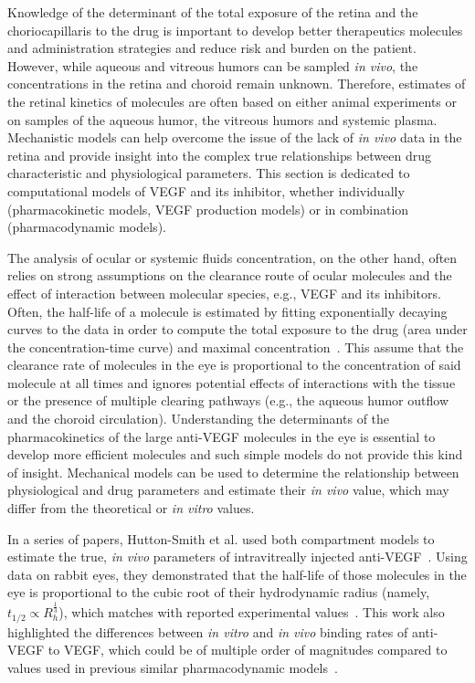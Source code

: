 \documentclass[11pt,a4paper]{article}
\begin{document}
Knowledge of the determinant of the total exposure of the retina and the choriocapillaris to the drug is important to develop better therapeutics molecules and administration strategies and reduce risk and burden on the patient.
However, while aqueous and vitreous humors can be sampled \textit{in vivo}, the concentrations in the retina and choroid remain unknown. 
Therefore, estimates of the retinal kinetics of molecules are often based on either animal experiments or on samples of the aqueous humor, the vitreous humors and systemic plasma.
Mechanistic models can help overcome the issue of the lack of \textit{in vivo} data in the retina and provide insight into the complex true relationships between drug characteristic and physiological parameters.
This section is dedicated to computational models of VEGF and its inhibitor, whether individually (pharmacokinetic models, VEGF production models) or in combination (pharmacodynamic models).


The analysis of ocular or systemic fluids concentration, on the other hand, often relies on strong assumptions on the clearance route of ocular molecules and the effect of interaction between molecular species, e.g., VEGF and its inhibitors.
Often, the half-life of a molecule is estimated by fitting exponentially decaying curves to the data in order to compute the total exposure to the drug (area under the concentration-time curve) and maximal concentration~\cite{Bakri_2007, Kaiser_2019, Park_2015, Park_2016, Xu_2013}.
This assume that the clearance rate of molecules in the eye is proportional to the concentration of said molecule at all times and ignores potential effects of interactions with the tissue or the presence of multiple clearing pathways (e.g., the aqueous humor outflow and the choroid circulation).
Understanding the determinants of the pharmacokinetics of the large anti-VEGF molecules in the eye is essential to develop more efficient molecules and such simple models do not provide this kind of insight.
Mechanical models can be used to determine the relationship between physiological and drug parameters and estimate their \textit{in vivo} value, which may differ from the theoretical or \textit{in vitro} values.

In a series of papers, Hutton-Smith et al. used both compartment models to estimate the true, \textit{in vivo} parameters of intravitreally injected anti-VEGF~\cite{hutton-smith_mechanistic_2016,hutton-smith_ocular_2017,hutton-smith_theoretical_2018}.
Using data on rabbit eyes, they demonstrated that the half-life of those molecules in the eye is proportional to the cubic root of their hydrodynamic radius (namely, $t_{1/2}\propto R_h^{\frac 1 3}$), which matches with reported experimental values~\cite{hutton-smith_mechanistic_2016}.
This work also highlighted the differences between \textit{in vitro} and \textit{in vivo} binding rates of anti-VEGF to VEGF, which could be of multiple order of magnitudes compared to values used in previous similar pharmacodynamic models~\cite{saunders_model_2015}.
\end{document}
